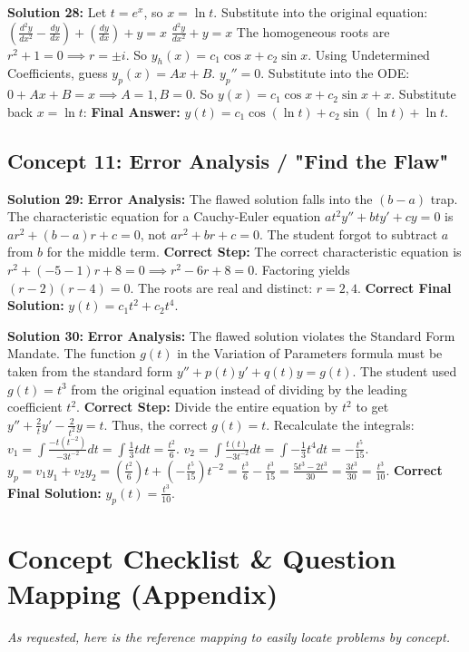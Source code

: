 \documentclass[11pt]{article}
\begin{document}
\textbf{Solution 28:}
Let $t = e^x$, so $x = \ln t$. Substitute into the original equation:
$\left(\frac{d^2y}{dx^2} - \frac{dy}{dx}\right) + \left(\frac{dy}{dx}\right) + y = x$
$\frac{d^2y}{dx^2} + y = x$
The homogeneous roots are $r^2 + 1 = 0 \implies r = \pm i$. So $y_h(x) = c_1 \cos x + c_2 \sin x$.
Using Undetermined Coefficients, guess $y_p(x) = Ax + B$.
$y_p'' = 0$. Substitute into the ODE: $0 + Ax + B = x \implies A = 1, B = 0$.
So $y(x) = c_1 \cos x + c_2 \sin x + x$.
Substitute back $x = \ln t$:
\textbf{Final Answer:} $y(t) = c_1 \cos(\ln t) + c_2 \sin(\ln t) + \ln t$.

\subsection*{Concept 11: Error Analysis / "Find the Flaw"}

\textbf{Solution 29:}
\textbf{Error Analysis:} The flawed solution falls into the $(b-a)$ trap. The characteristic equation for a Cauchy-Euler equation $at^2y'' + bty' + cy = 0$ is $ar^2 + (b - a)r + c = 0$, not $ar^2 + br + c = 0$. The student forgot to subtract $a$ from $b$ for the middle term.
\textbf{Correct Step:} The correct characteristic equation is $r^2 + (-5 - 1)r + 8 = 0 \implies r^2 - 6r + 8 = 0$.
Factoring yields $(r - 2)(r - 4) = 0$. The roots are real and distinct: $r = 2, 4$.
\textbf{Correct Final Solution:} $y(t) = c_1 t^2 + c_2 t^4$.

\textbf{Solution 30:}
\textbf{Error Analysis:} The flawed solution violates the Standard Form Mandate. The function $g(t)$ in the Variation of Parameters formula must be taken from the standard form $y'' + p(t)y' + q(t)y = g(t)$. The student used $g(t) = t^3$ from the original equation instead of dividing by the leading coefficient $t^2$.
\textbf{Correct Step:} Divide the entire equation by $t^2$ to get $y'' + \frac{2}{t}y' - \frac{2}{t^2}y = t$. Thus, the correct $g(t) = t$.
Recalculate the integrals:
$v_1 = \int \frac{-t(t^{-2})}{-3t^{-2}} dt = \int \frac{1}{3} t dt = \frac{t^2}{6}$.
$v_2 = \int \frac{t(t)}{-3t^{-2}} dt = \int -\frac{1}{3} t^4 dt = -\frac{t^5}{15}$.
$y_p = v_1 y_1 + v_2 y_2 = \left(\frac{t^2}{6}\right)t + \left(-\frac{t^5}{15}\right)t^{-2} = \frac{t^3}{6} - \frac{t^3}{15} = \frac{5t^3 - 2t^3}{30} = \frac{3t^3}{30} = \frac{t^3}{10}$.
\textbf{Correct Final Solution:} $y_p(t) = \frac{t^3}{10}$.

\newpage

\section{Concept Checklist \& Question Mapping (Appendix)}
\textit{As requested, here is the reference mapping to easily locate problems by concept.}
\end{document}
